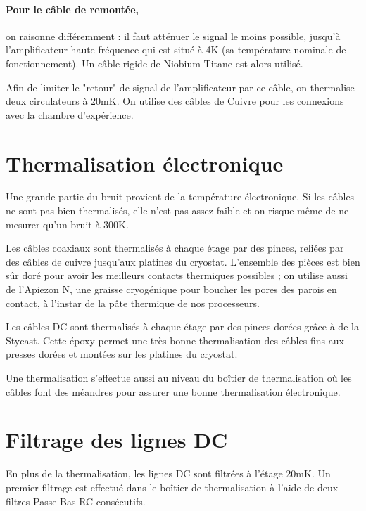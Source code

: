 \documentclass[a4paper,11pt]{report}
\begin{document}
\paragraph*{Pour le câble de remontée,} on raisonne différemment : il faut atténuer le signal le moins possible, jusqu'à l'amplificateur haute fréquence qui est situé à 4K (sa température nominale de fonctionnement). Un câble rigide de Niobium-Titane est alors utilisé.

Afin de limiter le "retour" de signal de l'amplificateur par ce câble, on thermalise deux circulateurs à 20mK. On utilise des câbles de Cuivre pour les connexions avec la chambre d'expérience.

\section{Thermalisation électronique}
Une grande partie du bruit provient de la température électronique. Si les câbles ne sont pas bien thermalisés, elle n'est pas assez faible et on risque même de ne mesurer qu'un bruit à 300K.

Les câbles coaxiaux sont thermalisés à chaque étage par des pinces, reliées par des câbles de cuivre jusqu'aux platines du cryostat. L'ensemble des pièces est bien sûr doré pour avoir les meilleurs contacts thermiques possibles ; on utilise aussi de l'Apiezon N, une graisse cryogénique pour boucher les pores des parois en contact, à l'instar de la pâte thermique de nos processeurs.
\newline

Les câbles DC sont thermalisés à chaque étage par des pinces dorées grâce à de la Stycast. Cette époxy permet une très bonne thermalisation des câbles fins aux presses dorées et montées sur les platines du cryostat.

Une thermalisation s'effectue aussi au niveau du boîtier de thermalisation où les câbles font des méandres pour assurer une bonne thermalisation électronique.

\section{Filtrage des lignes DC}
En plus de la thermalisation, les lignes DC sont filtrées à l'étage 20mK. Un premier filtrage est effectué dans le boîtier de thermalisation à l'aide de deux filtres Passe-Bas RC consécutifs.
\end{document}
